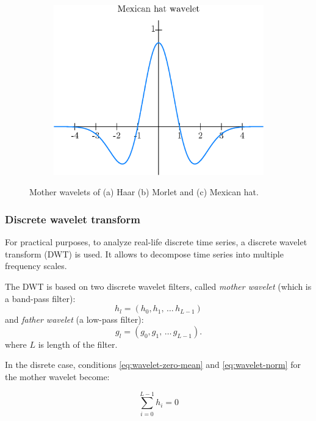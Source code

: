 \begin{figure}[h]
\begin{subfigure}{\minipagewidth}
		\centering
		\includegraphics[width=\textwidth]{figures/mexican.eps}
		\caption{}
	\end{subfigure}
	\caption{Mother wavelets of (a) Haar (b) Morlet and (c) Mexican hat.}
	\label{fig:wavelets}
\end{figure}

\subsubsection{Discrete wavelet transform}
For practical purposes, to analyze real-life discrete time series, a discrete wavelet transform (DWT) is used.
It allows to decompose time series into multiple frequency scales.

The DWT is based on two discrete wavelet filters, called \emph{mother wavelet}
(which is a band-pass filter):
\begin{equation}
h_l=(h_0, h_1, \, \ldots \, h_{L-1})
\end{equation}
and \emph{father wavelet} (a low-pass filter):
\begin{equation}
g_l=(g_0, g_1, \, \ldots \, g_{L-1}).
\end{equation}
where $L$ is length of the filter.

In the disrete case, conditions \ref{eq:wavelet-zero-mean} and \ref{eq:wavelet-norm} for the mother wavelet become:

\begin{equation}
	\sum_{i=0}^{L-1} h_i = 0
\end{equation}

